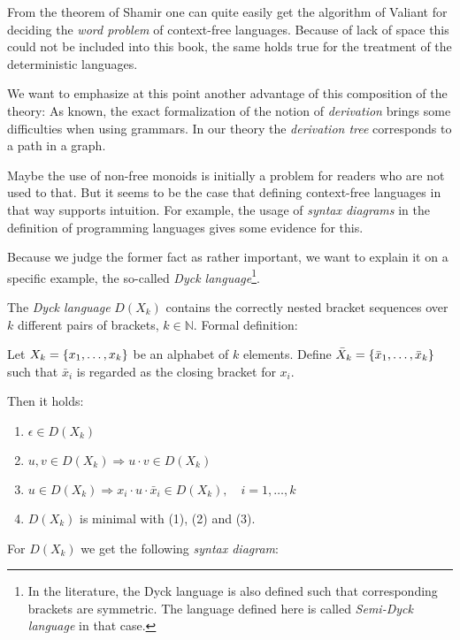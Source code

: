 From the theorem of Shamir one can quite easily get the algorithm of Valiant
for deciding the {\em word problem} of context-free languages. Because of lack
of space this could not be included into this book, the same holds true for the
treatment of the deterministic languages.

We want to emphasize at this point another advantage of this composition of the
theory: As known, the exact formalization of the notion of {\em derivation} 
brings some difficulties when using grammars. In our theory the {\em derivation
tree} corresponds to a path in a graph.

Maybe the use of non-free monoids is initially a problem for readers who are not
used to that. But it seems to be the case that defining context-free
languages in that way supports intuition. For example, the usage of
{\em syntax diagrams} in the definition of programming languages gives some
evidence for this.

Because we judge the former fact as rather important, we want to explain it on a
specific example, the so-called {\em Dyck language}\footnote{In the literature, 
the Dyck language is also defined such that corresponding brackets are
symmetric. The language defined here is called {\em Semi-Dyck language} in that 
case.}.

The {\em Dyck language} $D(X_k)$ contains the correctly nested bracket sequences
over $k$ different pairs of brackets, $k \in \mathbb{N}$. Formal definition:

Let $X_k = \mbox{$\{x_1, \ldots, x_k\}$}$ be an alphabet of $k$ elements. Define
$\bar{X}_k = \mbox{$\{\bar{x}_1, \ldots, \bar{x}_k\}$}$ such that $\bar{x}_i$ is
regarded as the closing bracket for $x_i$.

Then it holds:
\begin{enumerate}
  \item $\epsilon \in D(X_k)$
  \item $u, v \in D(X_k) \Rightarrow u \cdot v \in D(X_k)$
  \item $u \in D(X_k) \Rightarrow x_i \cdot u \cdot \bar{x}_i \in D(X_k),\quad i
  = 1, \ldots, k$
  \item $D(X_k)$ is minimal with (1), (2) and (3). 
\end{enumerate}

For $D(X_k)$ we get the following {\em syntax diagram}:

\begin{center}

\end{center}

